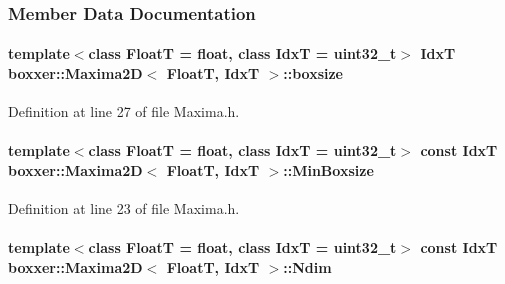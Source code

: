 \subsubsection{Member Data Documentation}
\paragraph[{\texorpdfstring{boxsize}{boxsize}}]{\setlength{\rightskip}{0pt plus 5cm}template$<$class FloatT  = float, class IdxT  = uint32\+\_\+t$>$ IdxT {\bf boxxer\+::\+Maxima2D}$<$ FloatT, IdxT $>$\+::boxsize}\hypertarget{classboxxer_1_1Maxima2D_a87d14d6b0d19746a0636204cba3cabfe}{}\label{classboxxer_1_1Maxima2D_a87d14d6b0d19746a0636204cba3cabfe}


Definition at line 27 of file Maxima.\+h.

\paragraph[{\texorpdfstring{Min\+Boxsize}{MinBoxsize}}]{\setlength{\rightskip}{0pt plus 5cm}template$<$class FloatT  = float, class IdxT  = uint32\+\_\+t$>$ const IdxT {\bf boxxer\+::\+Maxima2D}$<$ FloatT, IdxT $>$\+::Min\+Boxsize\hspace{0.3cm}{\ttfamily [static]}}\hypertarget{classboxxer_1_1Maxima2D_ab72858470871c7d5a90ed33839d7f220}{}\label{classboxxer_1_1Maxima2D_ab72858470871c7d5a90ed33839d7f220}


Definition at line 23 of file Maxima.\+h.

\paragraph[{\texorpdfstring{Ndim}{Ndim}}]{\setlength{\rightskip}{0pt plus 5cm}template$<$class FloatT  = float, class IdxT  = uint32\+\_\+t$>$ const IdxT {\bf boxxer\+::\+Maxima2D}$<$ FloatT, IdxT $>$\+::Ndim\hspace{0.3cm}{\ttfamily [static]}}\hypertarget{classboxxer_1_1Maxima2D_a839c84a80b49cd0bfae1715a04a45ddb}{}\label{classboxxer_1_1Maxima2D_a839c84a80b49cd0bfae1715a04a45ddb}


